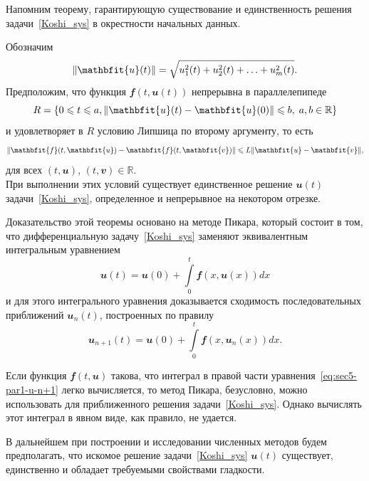 \documentclass[11pt,a4paper,twoside,listtotoc,bibtotoc]{report}
\numberwithin{equation}{section}
\theoremstyle{definition}
\theoremstyle{plain}
\DeclarePairedDelimiter\norm{\lVert}{\rVert}
\newcommand{\vfunc}[1]{\mathbfit{#1}}
\begin{document}
Напомним теорему, гарантирующую существование и единственность решения
задачи~\eqref{Koshi_sys} в окрестности начальных данных.

Обозначим
%
$$
    \norm{\vfunc{u}(t)} = \sqrt{u_1^2(t) + u_2^2(t) + \ldots + u_m^2(t)}.
$$
%
Предположим, что функция $\vfunc{f}(t, \vfunc{u}(t))$ непрерывна в параллелепипеде
%
$$
    R = \{0 \leqslant t \leqslant a, \norm{\vfunc{u}(t)-\vfunc{u}(0)}\leqslant b,\;
    a, b\in\mathbb{R}\}
$$
%
и удовлетворяет в $R$ условию Липшица по второму аргументу, то есть
%
$$
    \norm{\vfunc{f}(t, \vfunc{u}) - \vfunc{f}(t, \vfunc{v})} \leqslant
    L\norm{\vfunc{u} - \vfunc{v}},
$$
%
для всех $(t, \vfunc{u})$, $(t, \vfunc{v}) \in \mathbb{R}$.\\
При выполнении этих условий существует единственное решение $\vfunc{u}(t)$
задачи~\eqref{Koshi_sys}, определенное и непрерывное на некотором отрезке.

Доказательство этой теоремы основано на методе Пикара, который состоит в том,
что дифференциальную задачу~\eqref{Koshi_sys} заменяют эквивалентным интегральным
уравнением
%
$$
    \vfunc{u}(t) = \vfunc{u}(0) + \int \limits_0^t \vfunc{f}(x, \vfunc{u}(x))dx
$$
%
и для этого интегрального уравнения доказывается сходимость последовательных
приближений $\vfunc{u}_n(t)$, построенных по правилу
%
\begin{equation}
    \label{eq:sec5-par1-u-n+1}
    \vfunc{u}_{n+1}(t) = \vfunc{u}(0) + \int\limits_0^t
        \vfunc{f}(x, \vfunc{u}_n(x)) dx.
\end{equation}
%

Если функция $\vfunc{f}(t, \vfunc{u})$ такова, что интеграл в правой части
уравнения~\eqref{eq:sec5-par1-u-n+1} легко вычисляется, то метод Пикара,
безусловно, можно использовать для приближенного решения задачи~\eqref{Koshi_sys}.
Однако вычислять этот интеграл в явном виде, как правило, не удается.

В дальнейшем при построении и исследовании численных методов будем предполагать,
что искомое решение задачи~\eqref{Koshi_sys} $\vfunc{u}(t)$ существует,
единственно и обладает требуемыми свойствами гладкости.
\end{document}
